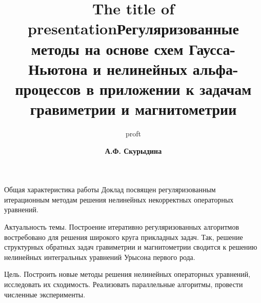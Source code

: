 \documentclass[10pt,pdf, mathserif, hyperref={unicode}]{beamer}
\title{The title of presentation}
\author{proft}
\begin{document}
	
	\small
	\footnotesize
	
\title[\hspace*{55mm}{\insertpagenumber /\pageref{lastpage}}]{{\small\textbf{Регуляризованные методы  на основе схем Гаусса-Ньютона и нелинейных альфа-процессов в приложении к задачам гравиметрии и магнитометрии}}}
\author[\insertlogo{\em{А.Ф. Скурыдина}}%
\hspace*{60mm}]{\textbf{\color{blue}А.Ф. Скурыдина}}
\frame{\titlepage}

\begin{frame}{Общая характеристика работы}
	Доклад посвящен регуляризованным итерационным методам решения нелинейных некорректных операторных уравнений.
	
	{\color{blue}Актуальность темы.} Построение итеративно регуляризованных алгоритмов востребовано для решения широкого круга прикладных задач. Так, решение структурных обратных задач гравиметрии и магнитометрии сводится к решению нелинейных интегральных уравнений Урысона первого рода.
	
	{\color{blue}Цель.} Построить новые методы решения нелинейных операторных уравнений, исследовать их сходимость. Реализовать параллельные алгоритмы, провести численные эксперименты.

\end{frame}
\end{document}
